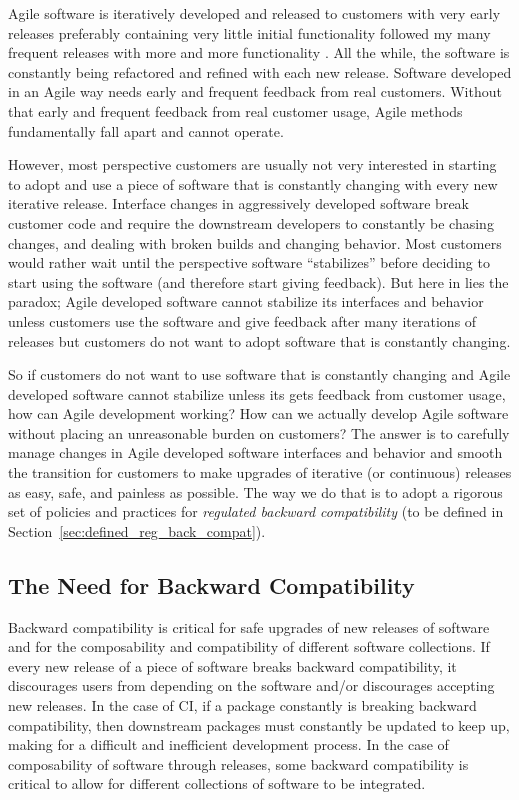 \documentclass[11pt]{SANDreport}
\begin{document}
Agile software is iteratively developed and released to customers with
very early releases preferably containing very little initial
functionality followed my many frequent releases with more and more
functionality {}\cite{AgileSoftwareDevelopment}.  All the while, the
software is constantly being refactored and refined with each new
release.  Software developed in an Agile way needs early and frequent
feedback from real customers.  Without that early and frequent
feedback from real customer usage, Agile methods fundamentally fall
apart and cannot operate.

However, most perspective customers are usually not very interested in
starting to adopt and use a piece of software that is constantly
changing with every new iterative release.  Interface changes in
aggressively developed software break customer code and require the
downstream developers to constantly be chasing changes, and dealing
with broken builds and changing behavior.  Most customers would rather
wait until the perspective software ``stabilizes'' before deciding to
start using the software (and therefore start giving feedback).  But
here in lies the paradox; Agile developed software cannot stabilize
its interfaces and behavior unless customers use the software and give
feedback after many iterations of releases but customers do not want
to adopt software that is constantly changing.

So if customers do not want to use software that is constantly
changing and Agile developed software cannot stabilize unless its gets
feedback from customer usage, how can Agile development working?  How
can we actually develop Agile software without placing an unreasonable
burden on customers?  The answer is to carefully manage changes in
Agile developed software interfaces and behavior and smooth the
transition for customers to make upgrades of iterative (or continuous)
releases as easy, safe, and painless as possible.  The way we do that
is to adopt a rigorous set of policies and practices for
{}\textit{regulated backward compatibility} (to be defined in
Section~\ref{sec:defined_reg_back_compat}).


%
{}\subsection{The Need for Backward Compatibility}
\label{sec:need_for_back_compat}
%

Backward compatibility is critical for safe upgrades of new releases
of software and for the composability and compatibility of different
software collections.  If every new release of a piece of software
breaks backward compatibility, it discourages users from depending on
the software and/or discourages accepting new releases.  In the case
of CI, if a package constantly is breaking backward compatibility, then
downstream packages must constantly be updated to keep up, making for
a difficult and inefficient development process.  In the case of
composability of software through releases, some backward
compatibility is critical to allow for different collections of
software to be integrated.
\end{document}
